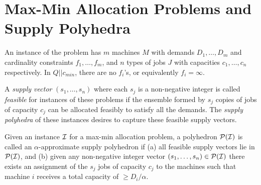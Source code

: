 \section{Max-Min Allocation Problems and Supply Polyhedra} \label{fsec:supplypolyhedra}
An instance of the \cckp problem has $m$ machines $M$ with demands $D_1,\ldots,D_m$ and cardinality constraints $f_1,\ldots, f_m$, and $n$  types of jobs $J$ with capacities $c_1,\ldots,c_n$ respectively.
In $Q||c_{min}$, there are no $f_i$'s, or equivalently $f_i = \infty$.

A {\em supply vector} $(s_1,\ldots,s_n)$ where each $s_j$ is a non-negative integer
is called {\em feasible} for instances of these problems if the ensemble formed by $s_j$ copies of jobs of capacity $c_j$ can be allocated feasibly to satisfy all the demands.
The {\em supply polyhedra} of these instances desires to capture these feasible supply vectors.

\begin{definition}\label{fdef:supp-poly}
	Given an instance ${\cal I}$ for a max-min allocation problem, a polyhedron ${\cal P}({\cal I})$ is called an $\alpha$-approximate supply polyhedron if
	(a) all feasible supply vectors lie in ${\cal P}({\cal I})$, and (b) given any non-negative integer vector $(s_1,\ldots,s_n)\in {\cal P}({\cal I})$ there exists an assignment
	of the $s_j$ jobs of capacity $c_j$ to the machines such that machine $i$ receives a total capacity of $\geq D_i/\alpha$.
\end{definition}

